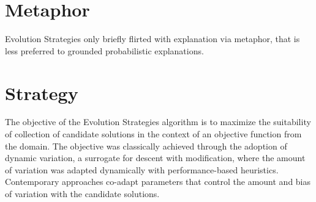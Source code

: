 \documentclass[a4paper, 11pt]{article}
\begin{document}
\section{Metaphor}
\label{sec:metaphor}
Evolution Strategies only briefly flirted with explanation via metaphor, that is less preferred to grounded probabilistic explanations.

\section{Strategy}
\label{sec:strategy}
The objective of the Evolution Strategies algorithm is to maximize the suitability of collection of candidate solutions in the context of an objective function from the domain.
The objective was classically achieved through the adoption of dynamic variation, a surrogate for descent with modification, where the amount of variation was adapted dynamically with performance-based heuristics. Contemporary approaches co-adapt parameters that control the amount and bias of variation with the candidate solutions.
\end{document}
